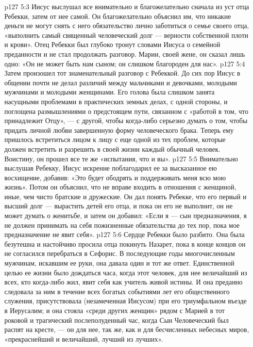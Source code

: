 \vs p127 5:3 Иисус выслушал все внимательно и благожелательно сначала из уст отца Ребекки, затем от нее самой. Он благожелательно объяснил им, что никакие деньги не могут снять с него обязательство лично заботиться о семье своего отца, «выполнить самый священный человеческий долг --- верности собственной плоти и крови». Отец Ребекки был глубоко тронут словами Иисуса о семейной преданности и не стал продолжать разговор. Марии, своей жене, он сказал лишь одно: «Он не может быть нам сыном; он слишком благороден для нас».
\vs p127 5:4 Затем произошел тот знаменательный разговор с Ребеккой. До сих пор Иисус в общении почти не делал различий между мальчиками и девочками, молодыми мужчинами и молодыми женщинами. Его голова была слишком занята насущными проблемами в практических земных делах, с одной стороны, и поглощена размышлениями о предстоящем пути, связанном с «работой в том, что принадлежит Отцу», --- с другой, чтобы когда\hyp{}либо серьезно думать о том, чтобы придать личной любви завершенную форму человеческого брака. Теперь ему пришлось встретиться лицом к лицу с еще одной из тех проблем, которые должен встретить и разрешить в своей жизни каждый обычный человек. Воистину, он прошел все те же «испытания, что и вы».
\vs p127 5:5 Внимательно выслушав Ребекку, Иисус искренне поблагодарил ее за высказанное ею восхищение, добавив: «Это будет ободрять и поддерживать меня всю мою жизнь». Потом он объяснил, что не вправе входить в отношения с женщиной, иные, чем чисто братские и дружеские. Он дал понять Ребекке, что его первый и высший долг --- вырастить детей его отца, и пока он его не выполнит, он не может думать о женитьбе, и затем он добавил: «Если я --- сын предназначения, я не должен принимать на себя пожизненные обязательства до тех пор, пока мое предназначение не явит себя».
\vs p127 5:6 Сердце Ребекки было разбито. Она была безутешна и настойчиво просила отца покинуть Назарет, пока в конце концов он не согласился перебраться в Сефорис. В последующие годы многочисленным мужчинам, искавшим ее руки, она давала один и тот же ответ. Единственной целью ее жизни было дождаться часа, когда этот человек, для нее величайший из всех, кто когда\hyp{}либо жил, явит себя как учитель живой истины. И она преданно следовала за ним в течение всех богатых событиями лет его общественного служения, присутствовала (незамеченная Иисусом) при его триумфальном въезде в Иерусалим; и она стояла «среди других женщин» рядом с Марией в тот роковой и трагический послеполуденный час, когда Сын Человеческий был распят на кресте, --- он для нее, так же, как и для бесчисленных небесных миров, «прекраснейший и величайший, лучший из лучших».
